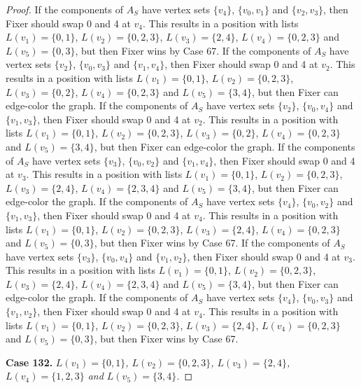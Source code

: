 \documentclass[12pt]{amsart}
\theoremstyle{plain}
\theoremstyle{definition}
\theoremstyle{remark}
\begin{document}
\begin{proof}
If the components of $A_S$ have vertex sets $\{v_4\}$, $\{v_0, v_1\}$ and $\{v_2, v_3\}$, then Fixer should swap 0 and 4 at $v_4$. This results in a position with lists $L(v_1) = \{0, 1\}$, $L(v_2) = \{0, 2, 3\}$, $L(v_3) = \{2, 4\}$, $L(v_4) = \{0, 2, 3\}$ and $L(v_5) = \{0, 3\}$, but then Fixer wins by Case 67.
If the components of $A_S$ have vertex sets $\{v_2\}$, $\{v_0, v_3\}$ and $\{v_1, v_4\}$, then Fixer should swap 0 and 4 at $v_2$. This results in a position with lists $L(v_1) = \{0, 1\}$, $L(v_2) = \{0, 2, 3\}$, $L(v_3) = \{0, 2\}$, $L(v_4) = \{0, 2, 3\}$ and $L(v_5) = \{3, 4\}$, but then Fixer can edge-color the graph.
If the components of $A_S$ have vertex sets $\{v_2\}$, $\{v_0, v_4\}$ and $\{v_1, v_3\}$, then Fixer should swap 0 and 4 at $v_2$. This results in a position with lists $L(v_1) = \{0, 1\}$, $L(v_2) = \{0, 2, 3\}$, $L(v_3) = \{0, 2\}$, $L(v_4) = \{0, 2, 3\}$ and $L(v_5) = \{3, 4\}$, but then Fixer can edge-color the graph.
If the components of $A_S$ have vertex sets $\{v_3\}$, $\{v_0, v_2\}$ and $\{v_1, v_4\}$, then Fixer should swap 0 and 4 at $v_3$. This results in a position with lists $L(v_1) = \{0, 1\}$, $L(v_2) = \{0, 2, 3\}$, $L(v_3) = \{2, 4\}$, $L(v_4) = \{2, 3, 4\}$ and $L(v_5) = \{3, 4\}$, but then Fixer can edge-color the graph.
If the components of $A_S$ have vertex sets $\{v_4\}$, $\{v_0, v_2\}$ and $\{v_1, v_3\}$, then Fixer should swap 0 and 4 at $v_4$. This results in a position with lists $L(v_1) = \{0, 1\}$, $L(v_2) = \{0, 2, 3\}$, $L(v_3) = \{2, 4\}$, $L(v_4) = \{0, 2, 3\}$ and $L(v_5) = \{0, 3\}$, but then Fixer wins by Case 67.
If the components of $A_S$ have vertex sets $\{v_3\}$, $\{v_0, v_4\}$ and $\{v_1, v_2\}$, then Fixer should swap 0 and 4 at $v_3$. This results in a position with lists $L(v_1) = \{0, 1\}$, $L(v_2) = \{0, 2, 3\}$, $L(v_3) = \{2, 4\}$, $L(v_4) = \{2, 3, 4\}$ and $L(v_5) = \{3, 4\}$, but then Fixer can edge-color the graph.
If the components of $A_S$ have vertex sets $\{v_4\}$, $\{v_0, v_3\}$ and $\{v_1, v_2\}$, then Fixer should swap 0 and 4 at $v_4$. This results in a position with lists $L(v_1) = \{0, 1\}$, $L(v_2) = \{0, 2, 3\}$, $L(v_3) = \{2, 4\}$, $L(v_4) = \{0, 2, 3\}$ and $L(v_5) = \{0, 3\}$, but then Fixer wins by Case 67.

\noindent\textbf{Case 132.  }\textit{$L(v_1) = \{0, 1\}$, $L(v_2) = \{0, 2, 3\}$, $L(v_3) = \{2, 4\}$, $L(v_4) = \{1, 2, 3\}$ and $L(v_5) = \{3, 4\}$.}


\end{proof}
\end{document}
